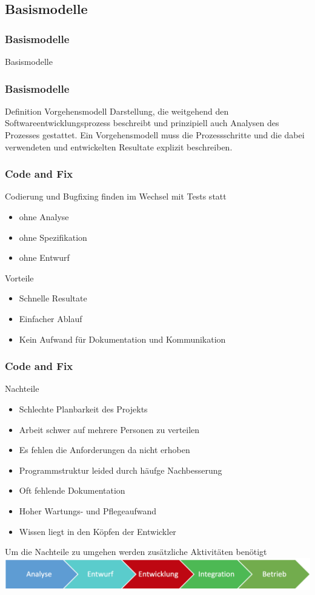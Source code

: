 \subsection{Basismodelle}
\begin{frame}
\frametitle{Basismodelle}
\huge Basismodelle
\end{frame}

\begin{frame}
\frametitle{Basismodelle}
	\begin{block}{Definition Vorgehensmodell}
		Darstellung, die weitgehend den Softwareentwicklungsprozess beschreibt und prinzipiell
		auch Analysen des Prozesses gestattet.
		Ein Vorgehensmodell muss die Prozessschritte und die dabei verwendeten und entwickelten
		Resultate explizit beschreiben.
	\end{block}
\end{frame}

\begin{frame}
\frametitle{Code and Fix}
	Codierung und Bugfixing finden im Wechsel mit Tests statt
	\begin{itemize}
		\item ohne Analyse
		\item ohne Spezifikation
		\item ohne Entwurf
	\end{itemize}
	\bigskip
	Vorteile
	\begin{itemize}
		\item Schnelle Resultate
		\item Einfacher Ablauf
		\item Kein Aufwand für Dokumentation und Kommunikation
	\end{itemize}
\end{frame}

\begin{frame}
\frametitle{Code and Fix}
	Nachteile
	\begin{itemize}
		\item Schlechte Planbarkeit des Projekts
		\item Arbeit schwer auf mehrere Personen zu verteilen
		\item Es fehlen die Anforderungen da nicht erhoben
		\item Programmstruktur leided durch häufge Nachbesserung
		\item Oft fehlende Dokumentation
		\item Hoher Wartungs- und Pflegeaufwand
		\item Wissen liegt in den Köpfen der Entwickler
	\end{itemize}
	\bigskip
	Um die Nachteile zu umgehen werden zusätzliche Aktivitäten benötigt
	\center\includegraphics[width=1\textwidth,
		keepaspectratio=true]{bilder/se_phasen.png}
\end{frame}

